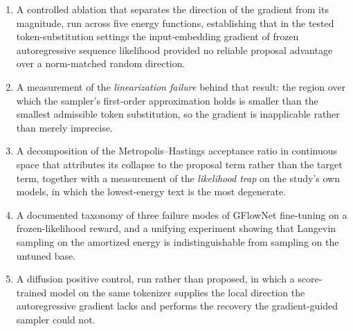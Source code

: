 \begin{enumerate}
    \item A controlled ablation that separates the direction of the gradient from its magnitude, run across five energy functions, establishing that in the tested token-substitution settings the input-embedding gradient of frozen autoregressive sequence likelihood provided no reliable proposal advantage over a norm-matched random direction.
    \item A measurement of the \emph{linearization failure} behind that result: the region over which the sampler's first-order approximation holds is smaller than the smallest admissible token substitution, so the gradient is inapplicable rather than merely imprecise.
    \item A decomposition of the Metropolis--Hastings acceptance ratio in continuous space that attributes its collapse to the proposal term rather than the target term, together with a measurement of the \emph{likelihood trap} on the study's own models, in which the lowest-energy text is the most degenerate.
    \item A documented taxonomy of three failure modes of GFlowNet fine-tuning on a frozen-likelihood reward, and a unifying experiment showing that Langevin sampling on the amortized energy is indistinguishable from sampling on the untuned base.
    \item A diffusion positive control, run rather than proposed, in which a score-trained model on the same tokenizer supplies the local direction the autoregressive gradient lacks and performs the recovery the gradient-guided sampler could not.
\end{enumerate}

